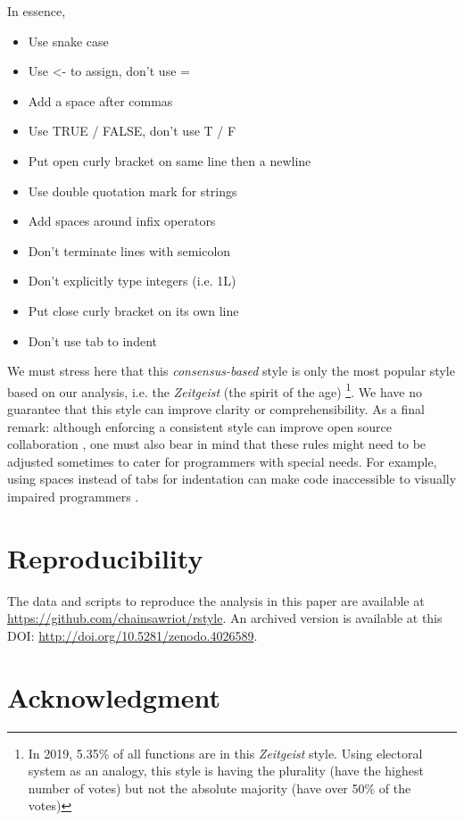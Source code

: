 In essence,

\begin{itemize}
  \item Use snake case
  \item Use <- to assign, don't use =
  \item Add a space after commas
  \item Use TRUE / FALSE, don't use T / F
  \item Put open curly bracket on same line then a newline
  \item Use double quotation mark for strings
  \item Add spaces around infix operators
  \item Don't terminate lines with semicolon
  \item Don’t explicitly type integers (i.e. 1L)
  \item Put close curly bracket on its own line
  \item Don't use tab to indent
\end{itemize}

We must stress here that this \emph{consensus-based} style is only the most popular style based on our analysis, i.e. the \emph{Zeitgeist} (the spirit of the age) \footnote{In 2019, 5.35\% of all functions are in this \emph{Zeitgeist} style. Using electoral system as an analogy, this style is having the plurality (have the highest number of votes) but not the absolute majority (have over 50\% of the votes)}. We have no guarantee that this style can improve clarity or comprehensibility. As a final remark: although enforcing a consistent style can improve open source collaboration \citep{wang}, one must also bear in mind that these rules might need to be adjusted sometimes to cater for programmers with special needs. For example, using spaces instead of tabs for indentation can make code inaccessible to visually impaired programmers \citep{mosal}.

\section{Reproducibility}

The data and scripts to reproduce the analysis in this paper are available at \url{https://github.com/chainsawriot/rstyle}. An archived version is available at this DOI: \url{http://doi.org/10.5281/zenodo.4026589}.

\section{Acknowledgment}

